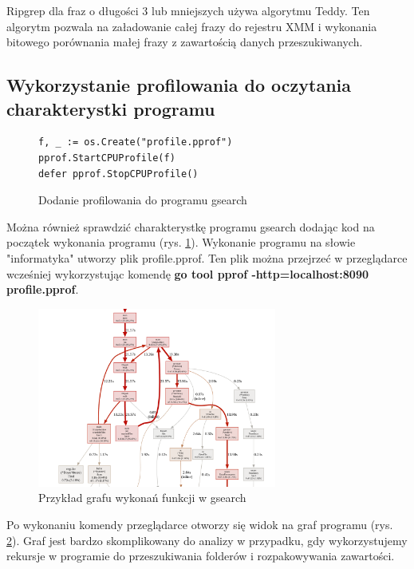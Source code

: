 Ripgrep dla fraz o długości 3 lub mniejszych używa algorytmu Teddy. Ten algorytm
pozwala na załadowanie całej frazy do rejestru XMM i wykonania bitowego 
porównania małej frazy z zawartością danych przeszukiwanych.

\subsection{Wykorzystanie profilowania do oczytania charakterystki programu}

\begin{figure}[h]
  \centering
  \begin{lstlisting}
f, _ := os.Create("profile.pprof")
pprof.StartCPUProfile(f)
defer pprof.StopCPUProfile()
  \end{lstlisting}
  \caption{Dodanie profilowania do programu gsearch}
  \label{fig:code:profilerGsearch}
\end{figure}

Można również sprawdzić charakterystkę programu gsearch dodając kod na początek 
wykonania programu (rys. \ref{fig:code:profilerGsearch}). Wykonanie programu na
słowie "informatyka" utworzy plik profile.pprof. Ten plik można przejrzeć w 
przeglądarce wcześniej wykorzystując komendę \textbf{go tool pprof -http=localhost:8090 profile.pprof}.

\begin{figure}[h]
\centering
\includegraphics[width=0.7\textwidth]{./images/profiler1.png}
\caption{Przykład grafu wykonań funkcji w gsearch}
\label{fig:profilerGsearch1}
\end{figure}

Po wykonaniu komendy przeglądarce otworzy się widok na graf programu (rys. \ref{fig:profilerGsearch1}).
Graf jest bardzo skomplikowany do analizy w przypadku, gdy wykorzystujemy rekursje w programie do
przeszukiwania folderów i rozpakowywania zawartości.

